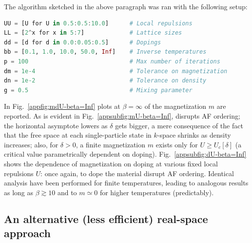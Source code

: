 The algorithm sketched in the above paragraph was ran with the following setup:
\begin{lstlisting}[language=julia]
UU = [U for U in 0.5:0.5:10.0]      # Local repulsions
LL = [2^x for x in 5:7]             # Lattice sizes
dd = [d for d in 0.0:0.05:0.5]      # Dopings
bb = [0.1, 1.0, 10.0, 50.0, Inf]    # Inverse temperatures
p = 100                             # Max number of iterations
dm = 1e-4                           # Tolerance on magnetization
dn = 1e-2                           # Tolerance on density
g = 0.5                             # Mixing parameter
\end{lstlisting}
In Fig.~\ref{appfig:mdU-beta=Inf} plots at $\beta=\infty$ of the magnetization $m$ are reported. As is evident in Fig.~\ref{appsubfig:mU-beta=Inf}, disrupts AF ordering; the horizontal asymptote lowers as $\delta$ gets bigger, a mere consequence of the fact that the free space at each single-particle state in $k$-space shrinks as density increases; also, for $\delta > 0$, a finite magnetization $m$ exists only for $U \ge U_c[\delta]$ (a critical value parametrically dependent on doping). Fig.~\ref{appsubfig:dU-beta=Inf} shows the dependence of magnetization on doping at various fixed local repulsions $U$: once again, to dope the material disrupt AF ordering. Identical analysis have been performed for finite temperatures, leading to analogous results as long as $\beta \gtrsim 10$ and to $m \simeq 0$ for higher temperatures (predictably).

\subsection{An alternative (less efficient) real-space approach}

